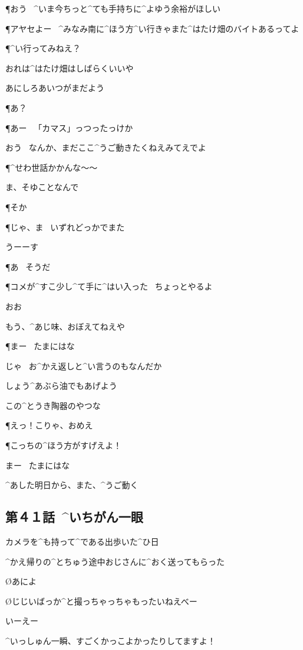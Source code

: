 \P おう
\ ^{いま}{今}ちっと^{ても}{手持}ちに^{よゆう}{余裕}がほしい

\P アヤセよー
\ ^{みなみ}{南}に^{ほう}{方}^{い}{行}きゃまた^{はたけ}{畑}のバイトあるってよ

\P ^{い}{行}ってみねえ？

\Y おれは^{はたけ}{畑}はしばらくいいや

\page
\Y あにしろあいつがまだよう

\P あ？

\P あー
\ 「カマス」っつったっけか

\Y おう
\ なんか、まだここ^{うご}{動}きたくねえみてえでよ

\page
\P ^{せわ}{世話}かかんな〜〜

\Y ま、そゆことなんで

\P そか

\P じゃ、ま
\ いずれどっかでまた

\Y うーーす

\P あ
\ そうだ

\page
\P コメが^{すこ}{少}し^{て}{手}に^{はい}{入}った
\ ちょっとやるよ

\Y おお

\Y もう、^{あじ}{味}、おぼえてねえや

\P まー
\ たまにはな

\Y じゃ
\ お^{かえ}{返}しと^{い}{言}うのもなんだか

\Y しょう^{あぶら}{油}でもあげよう

\Y この^{とうき}{陶器}のやつな

\P えっ！こりゃ、おめえ

\page
\P こっちの^{ほう}{方}がすげえよ！

\Y まー
\ たまにはな

\page[130]
\Y ^{あした}{明日}から、また、^{うご}{動}く


\subsection{第４１話\ ^{いちがん}{一眼}}

\page[132]
\A カメラを^{も}{持}って^{である}{出歩}いた^{ひ}{日}

\A ^{かえ}{帰}りの^{とちゅう}{途中}おじさんに^{おく}{送}ってもらった

\page
\O あによ

\O じじいばっか^{と}{撮}っちゃっちゃもったいねえべー

\A いーえー

\A ^{いっしゅん}{一瞬}、すごくかっこよかったりしてますよ！

